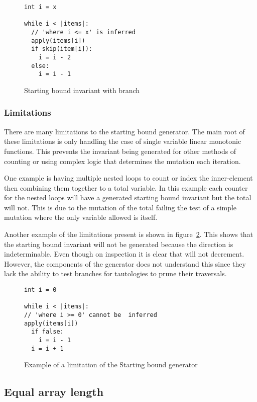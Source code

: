 \begin{figure}[ht]
\begin{lstlisting}
int i = x

while i < |items|:
  // 'where i <= x' is inferred
  apply(items[i])
  if skip(item[i]):
    i = i - 2
  else:
    i = i - 1
\end{lstlisting}
\caption{Starting bound invariant with branch}
\label{lst:whiley-start-if}
\end{figure}

\subsubsection{Limitations}

There are many limitations to the starting bound generator.
The main root of these limitations is only handling the case
of single variable linear monotonic functions. 
This prevents the invariant being generated for other
methods of counting or using complex logic that determines
the mutation each iteration.

One example is having multiple nested loops to count or index
the inner-element then combining them together to a total variable.
In this example each counter for the nested loops will have a generated
starting bound invariant but the total will not.
This is due to the mutation of the total failing the test of a simple
mutation where the only variable allowed is itself.

Another example of the limitations present is shown in figure~\ref{lst:whiley-start-limit}.
This shows that the starting bound invariant will not be generated because
the direction is indeterminable.
Even though on inspection it is clear that  will not decrement.
However, the components of the generator does not understand this
since they lack the ability to test branches for tautologies
to prune their traversals. 

\begin{figure}[ht]
\begin{lstlisting}
int i = 0

while i < |items|:
// 'where i >= 0' cannot be  inferred
apply(items[i])
  if false:
    i = i - 1
  i = i + 1
\end{lstlisting}
\caption{Example of a limitation of the Starting bound generator}
\label{lst:whiley-start-limit}
\end{figure}

\subsection{Equal array length}


